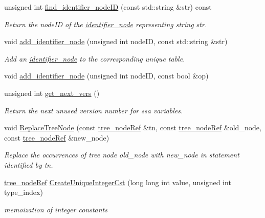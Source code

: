 \begin{DoxyCompactItemize}
unsigned int \hyperlink{classtree__manager_a9b84caccb4095fc91cbf434b0deb25a8}{find\+\_\+identifier\+\_\+node\+ID} (const std\+::string \&str) const
\begin{DoxyCompactList}\small\item\em Return the node\+ID of the \hyperlink{structidentifier__node}{identifier\+\_\+node} representing string str. \end{DoxyCompactList}\item 
void \hyperlink{classtree__manager_a109bce483e98aa5940917e1e84cea480}{add\+\_\+identifier\+\_\+node} (unsigned int node\+ID, const std\+::string \&str)
\begin{DoxyCompactList}\small\item\em Add an \hyperlink{structidentifier__node}{identifier\+\_\+node} to the corresponding unique table. \end{DoxyCompactList}\item 
void \hyperlink{classtree__manager_ae318c7957e92feef578a52f2858d4f50}{add\+\_\+identifier\+\_\+node} (unsigned int node\+ID, const bool \&op)
\item 
unsigned int \hyperlink{classtree__manager_a7cf60d6250535345f863880c615e7d95}{get\+\_\+next\+\_\+vers} ()
\begin{DoxyCompactList}\small\item\em Return the next unused version number for ssa variables. \end{DoxyCompactList}\item 
void \hyperlink{classtree__manager_af0410e1ad992f9995223f187563e0289}{Replace\+Tree\+Node} (const \hyperlink{tree__node_8hpp_a6ee377554d1c4871ad66a337eaa67fd5}{tree\+\_\+node\+Ref} \&tn, const \hyperlink{tree__node_8hpp_a6ee377554d1c4871ad66a337eaa67fd5}{tree\+\_\+node\+Ref} \&old\+\_\+node, const \hyperlink{tree__node_8hpp_a6ee377554d1c4871ad66a337eaa67fd5}{tree\+\_\+node\+Ref} \&new\+\_\+node)
\begin{DoxyCompactList}\small\item\em Replace the occurrences of tree node old\+\_\+node with new\+\_\+node in statement identified by tn. \end{DoxyCompactList}\item 
\hyperlink{tree__node_8hpp_a6ee377554d1c4871ad66a337eaa67fd5}{tree\+\_\+node\+Ref} \hyperlink{classtree__manager_a45e4ad0e5ed7a544fb1527ba11bc9fb2}{Create\+Unique\+Integer\+Cst} (long long int value, unsigned int type\+\_\+index)
\begin{DoxyCompactList}\small\item\em memoization of integer constants \end{DoxyCompactList}\item 

\end{DoxyCompactItemize}
